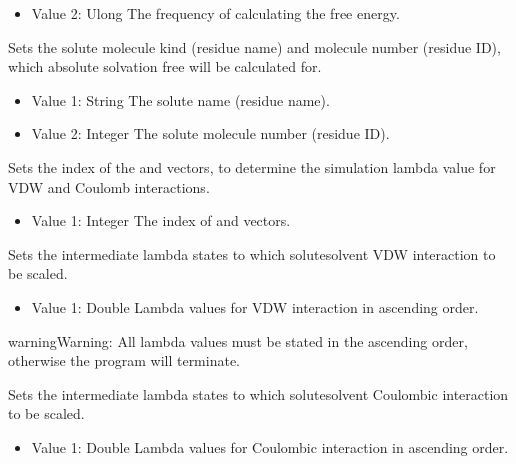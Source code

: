 \documentclass[letterpaper,10pt,english]{sphinxmanual}
\begin{document}
\begin{description}
\begin{description}
\begin{itemize}
\item {} 
Value 2: Ulong \sphinxhyphen{} The frequency of calculating the free energy.

\end{itemize}

\item[{\sphinxcode{\sphinxupquote{MoleculeType}}}] \leavevmode
Sets the solute molecule kind (residue name) and molecule number (residue ID), which absolute solvation free will be calculated for.
\begin{itemize}
\item {} 
Value 1: String \sphinxhyphen{} The solute name (residue name).

\item {} 
Value 2: Integer \sphinxhyphen{} The solute molecule number (residue ID).

\end{itemize}

\item[{\sphinxcode{\sphinxupquote{InitialState}}}] \leavevmode
Sets the index of the  and  vectors, to determine the simulation lambda value for VDW and Coulomb interactions.
\begin{itemize}
\item {} 
Value 1: Integer \sphinxhyphen{} The index of  and  vectors.

\end{itemize}

\item[{\sphinxcode{\sphinxupquote{LambdaVDW}}}] \leavevmode
Sets the intermediate lambda states to which solute\sphinxhyphen{}solvent VDW interaction to be scaled.
\begin{itemize}
\item {} 
Value 1: Double \sphinxhyphen{} Lambda values for VDW interaction in ascending order.

\end{itemize}

\begin{sphinxadmonition}{warning}{Warning:}
All lambda values must be stated in the ascending order, otherwise the program will terminate.
\end{sphinxadmonition}

\item[{\sphinxcode{\sphinxupquote{LambdaCoulomb}}}] \leavevmode
Sets the intermediate lambda states to which solute\sphinxhyphen{}solvent Coulombic interaction to be scaled.
\begin{itemize}
\item {} 
Value 1: Double \sphinxhyphen{} Lambda values for Coulombic interaction in ascending order.


\end{itemize}
\end{description}
\end{description}
\end{document}
